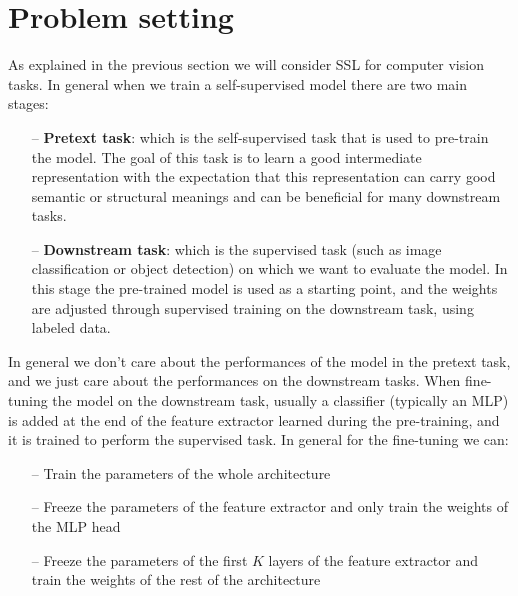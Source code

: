 \documentclass[12pt]{article}
\begin{document}
	\section{Problem setting}
	As explained in the previous section we will consider SSL for computer vision tasks. In general when we train a self-supervised model there are two main stages:
	\begin{itemize}
		\item[--] \textbf{Pretext task}: which is the self-supervised task that is used to pre-train the model. The goal of this task is to learn a good intermediate representation with the expectation that this representation can carry good semantic or structural meanings and can be beneficial for many downstream tasks.
		\item[--] \textbf{Downstream task}: which is the supervised task (such as image classification or object detection) on which we want to evaluate the model. In this stage the pre-trained model is used as a starting point, and the weights are adjusted through supervised training on the downstream task, using labeled data.
	\end{itemize}
	In general we don't care about the performances of the model in the pretext task, and we just care about the performances on the downstream tasks. When fine-tuning the model on the downstream task, usually a classifier (typically an MLP) is added at the end of the feature extractor learned during the pre-training, and it is trained to perform the supervised task. In general for the fine-tuning we can:
	\begin{itemize}
		\item[--] Train the parameters of the whole architecture
		\item[--] Freeze the parameters of the feature extractor and only train the weights of the MLP head
		\item[--] Freeze the parameters of the first $K$ layers of the feature extractor and train the weights of the rest of the architecture
	\end{itemize}
\end{document}
